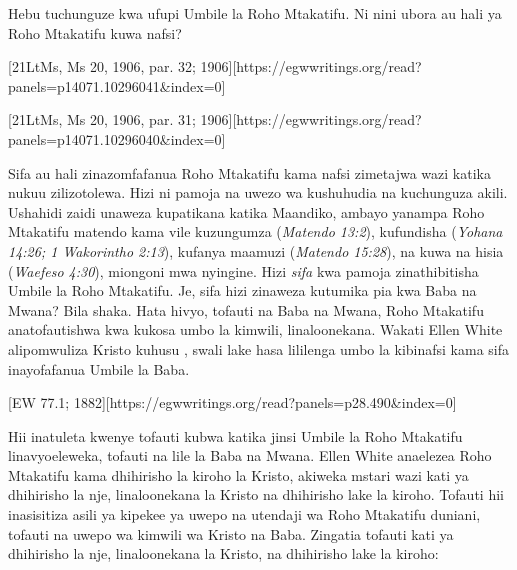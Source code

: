 Hebu tuchunguze kwa ufupi Umbile la Roho Mtakatifu. Ni nini ubora au hali ya Roho Mtakatifu kuwa nafsi?

[21LtMs, Ms 20, 1906, par. 32; 1906][https://egwwritings.org/read?panels=p14071.10296041&index=0]

[21LtMs, Ms 20, 1906, par. 31; 1906][https://egwwritings.org/read?panels=p14071.10296040&index=0]

Sifa au hali zinazomfafanua Roho Mtakatifu kama nafsi zimetajwa wazi katika nukuu zilizotolewa. Hizi ni pamoja na uwezo wa kushuhudia na kuchunguza akili. Ushahidi zaidi unaweza kupatikana katika Maandiko, ambayo yanampa Roho Mtakatifu matendo kama vile kuzungumza (\textit{Matendo 13:2}), kufundisha (\textit{Yohana 14:26; 1 Wakorintho 2:13}), kufanya maamuzi (\textit{Matendo 15:28}), na kuwa na hisia (\textit{Waefeso 4:30}), miongoni mwa nyingine. Hizi \textit{sifa} kwa pamoja zinathibitisha Umbile la Roho Mtakatifu. Je, sifa hizi zinaweza kutumika pia kwa Baba na Mwana? Bila shaka. Hata hivyo, tofauti na Baba na Mwana, Roho Mtakatifu anatofautishwa kwa kukosa umbo la kimwili, linaloonekana. Wakati Ellen White alipomwuliza Kristo kuhusu , swali lake hasa lililenga umbo la kibinafsi kama sifa inayofafanua Umbile la Baba.

[EW 77.1; 1882][https://egwwritings.org/read?panels=p28.490&index=0]

Hii inatuleta kwenye tofauti kubwa katika jinsi Umbile la Roho Mtakatifu linavyoeleweka, tofauti na lile la Baba na Mwana. Ellen White anaelezea Roho Mtakatifu kama dhihirisho la kiroho la Kristo, akiweka mstari wazi kati ya dhihirisho la nje, linaloonekana la Kristo na dhihirisho lake la kiroho. Tofauti hii inasisitiza asili ya kipekee ya uwepo na utendaji wa Roho Mtakatifu duniani, tofauti na uwepo wa kimwili wa Kristo na Baba. Zingatia tofauti kati ya dhihirisho la nje, linaloonekana la Kristo, na dhihirisho lake la kiroho:

